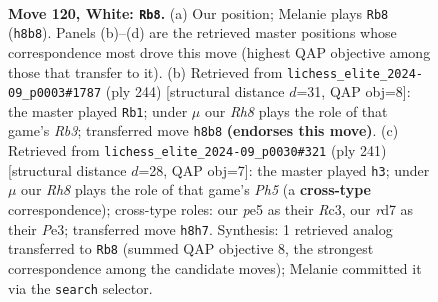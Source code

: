 \documentclass[11pt]{article}
\begin{document}
\clearpage

\begin{figure}[p]\centering
\begin{subfigure}{0.46\textwidth}\centering
\resizebox{\linewidth}{!}{%
\newchessgame
\chessboard[
  setfen={7R/3r3n/8/4p2p/6kb/8/3p4/3K4 w - - 4 120},
  showmover=false,
  pgfstyle=straightmove, color=movearrow, markmove={h8-b8}
]}
\caption{}
\end{subfigure}\hfill
\begin{subfigure}{0.46\textwidth}\centering
\resizebox{\linewidth}{!}{%
\newchessgame
\chessboard[
  setfen={8/8/8/5p2/5k2/1R6/3r1p2/5K2 w - - 6 123},
  showmover=false,
  pgfstyle=straightmove, color=movearrow, markmove={b3-b1}
]}
\caption{}
\end{subfigure}
\\[4pt]
\begin{subfigure}{0.46\textwidth}\centering
\resizebox{\linewidth}{!}{%
\newchessgame
\chessboard[
  setfen={1R6/6k1/6P1/3B4/7p/2r1p3/6P1/3R2K1 b - - 0 121},
  showmover=false,
  pgfstyle=straightmove, color=movearrow, markmove={h4-h3}
]}
\caption{}
\end{subfigure}\hfill

\caption{\textbf{Move 120, White: \texttt{Rb8}.} (a) Our position; Melanie plays \texttt{Rb8} (\texttt{h8b8}). Panels (b)--(d) are the retrieved master positions whose correspondence most drove this move (highest QAP objective among those that transfer to it). (b) Retrieved from \texttt{lichess\_elite\_2024-09\_p0003\#1787} (ply 244) [structural distance $d$=31, QAP obj=8]: the master played \texttt{Rb1}; under $\mu$ our \emph{Rh8} plays the role of that game's \emph{Rb3}; transferred move \texttt{h8b8} \textbf{(endorses this move)}. (c) Retrieved from \texttt{lichess\_elite\_2024-09\_p0030\#321} (ply 241) [structural distance $d$=28, QAP obj=7]: the master played \texttt{h3}; under $\mu$ our \emph{Rh8} plays the role of that game's \emph{Ph5} (a \textbf{cross-type} correspondence); cross-type roles: our \emph{p}e5 as their \emph{R}c3, our \emph{r}d7 as their \emph{P}e3; transferred move \texttt{h8h7}. Synthesis: 1 retrieved analog transferred to \texttt{Rb8} (summed QAP objective 8, the strongest correspondence among the candidate moves); Melanie committed it via the \texttt{search} selector.}
\label{fig:thought-m238}
\end{figure}

\clearpage
\end{document}
